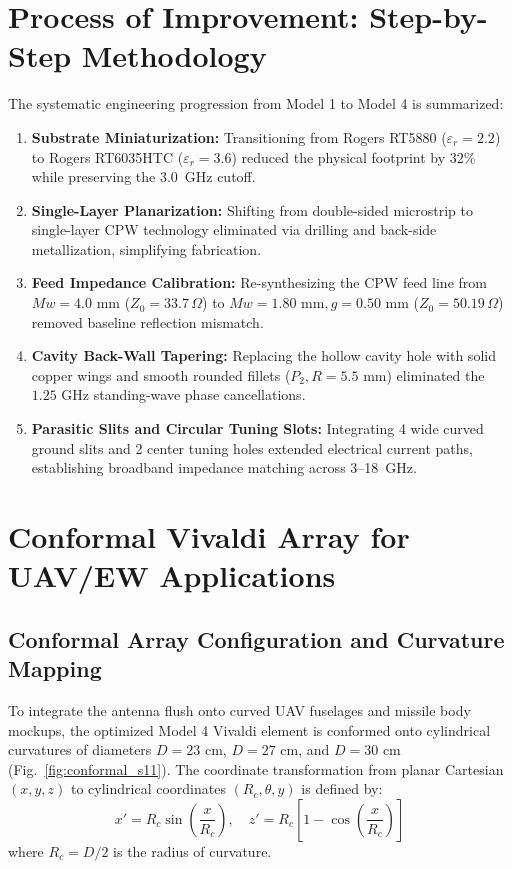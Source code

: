 \documentclass[journal,compsoc,twocolumn,10pt]{IEEEtran}
\begin{document}
\section{Process of Improvement: Step-by-Step Methodology}
The systematic engineering progression from Model 1 to Model 4 is summarized:
\begin{enumerate}
    \item \textbf{Substrate Miniaturization:} Transitioning from Rogers RT5880 ($\varepsilon_r = 2.2$) to Rogers RT6035HTC ($\varepsilon_r = 3.6$) reduced the physical footprint by $32\%$ while preserving the 3.0~GHz cutoff.
    \item \textbf{Single-Layer Planarization:} Shifting from double-sided microstrip to single-layer CPW technology eliminated via drilling and back-side metallization, simplifying fabrication.
    \item \textbf{Feed Impedance Calibration:} Re-synthesizing the CPW feed line from $Mw = 4.0\text{ mm}$ ($Z_0 = 33.7\,\Omega$) to $Mw = 1.80\text{ mm}, g = 0.50\text{ mm}$ ($Z_0 = 50.19\,\Omega$) removed baseline reflection mismatch.
    \item \textbf{Cavity Back-Wall Tapering:} Replacing the hollow cavity hole with solid copper wings and smooth rounded fillets ($P_2, R = 5.5\text{ mm}$) eliminated the $1.25\text{ GHz}$ standing-wave phase cancellations.
    \item \textbf{Parasitic Slits and Circular Tuning Slots:} Integrating 4 wide curved ground slits and 2 center tuning holes extended electrical current paths, establishing broadband impedance matching across 3--18~GHz.
\end{enumerate}

\section{Conformal Vivaldi Array for UAV/EW Applications}

\subsection{Conformal Array Configuration and Curvature Mapping}
To integrate the antenna flush onto curved UAV fuselages and missile body mockups, the optimized Model 4 Vivaldi element is conformed onto cylindrical curvatures of diameters $D = 23\text{ cm}$, $D = 27\text{ cm}$, and $D = 30\text{ cm}$ (Fig.~\ref{fig:conformal_s11}). The coordinate transformation from planar Cartesian $(x, y, z)$ to cylindrical coordinates $(R_c, \theta, y)$ is defined by:
\begin{equation}
x' = R_c \sin\left(\frac{x}{R_c}\right), \quad z' = R_c \left[1 - \cos\left(\frac{x}{R_c}\right)\right]
\end{equation}
where $R_c = D/2$ is the radius of curvature.
\end{document}
